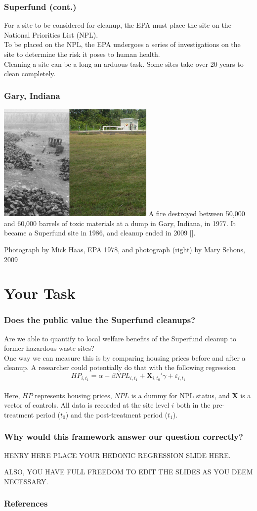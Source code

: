 \documentclass{beamer}
\begin{document}
\begin{frame}
\frametitle{Superfund (cont.)}
For a site to be considered for cleanup, the EPA must place the site on the National Priorities List (NPL). 
\\[1em]\pause
To be placed on the NPL, the EPA undergoes a series of investigations on the site to determine the risk it poses to human health.
\\[1em]\pause
Cleaning a site can be a long an arduous task. Some sites take over 20 years to clean completely. 
\end{frame}

\begin{frame}
\frametitle{Gary, Indiana}
\includegraphics[width=3in, center]{superfund}
\scriptsize{ A fire destroyed between 50,000 and 60,000 barrels of toxic materials at a dump in Gary, Indiana, in 1977. It became a Superfund site in 1986, and cleanup ended in 2009 [\cite{natgeo}].}

\tiny{ Photograph by Mick Haas, EPA 1978, and photograph (right) by Mary Schons, 2009}
\end{frame}

\section{Your Task}
\begin{frame}
\frametitle{Does the public value the Superfund cleanups?}
Are we able to quantify to local welfare benefits of the Superfund cleanup to former hazardous waste sites?
\\[1em]\pause
One way we can measure this is by comparing housing prices before and after a cleanup. A researcher could potentially do that with the following regression
\[ HP_{i,t_1} = \alpha + \beta NPL_{i,t_1} +\textbf{X}_{i,t_0}' \gamma  + \varepsilon_{i,t_1} \]
\\[1em]\pause
Here, $HP$ represents housing prices, $NPL$ is a dummy for NPL status, and \textbf{X} is a vector of controls. All data is recorded at the site level $i$ both in the pre-treatment period ($t_0$) and the post-treatment period ($t_1$).
\end{frame}

\begin{frame}
\frametitle{Why would this framework answer our question correctly?}
HENRY HERE PLACE YOUR HEDONIC REGRESSION SLIDE HERE. 

ALSO, YOU HAVE FULL FREEDOM TO EDIT THE SLIDES AS YOU DEEM NECESSARY.
\end{frame}

\begin{frame}
\frametitle{References}


\end{frame}
\end{document}
